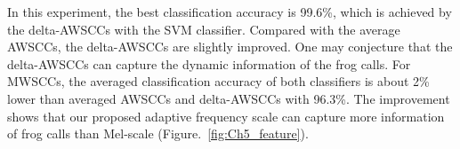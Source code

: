 \begin{table}[htb!]
\centering
\caption{Weighted classification accuracy (mean and standard deviation) comparison for five feature sets with two classifiers.}
\label{tab:accuracyfor24}
\end{table}

In this experiment, the best classification accuracy is 99.6\%, which is achieved by the delta-AWSCCs with the SVM classifier. Compared with the average AWSCCs, the delta-AWSCCs are slightly improved. One may conjecture that the delta-AWSCCs can capture the dynamic information of the frog calls. For MWSCCs, the averaged classification accuracy of both classifiers is about 2\% lower than averaged AWSCCs and delta-AWSCCs with 96.3\%. The improvement shows that our proposed adaptive frequency scale can capture more information of frog calls than Mel-scale (Figure.~\ref{fig:Ch5_feature}). 

